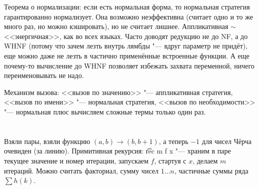 Теорема о нормализации: если есть нормальная форма, то нормальная стратегия гарантированно нормализует.
Она возможно неэффективна (считает одно и то же много раз, но можно кэшировать), но не считает лишнее.
Аппликативная $\sim$ <<энергичная>>, как во всех языках.
Часто доводят редукцию не до NF, а до WHNF (потому что зачем лезть внутрь лямбды "--- вдруг параметр не придёт),
еще можно даже не лезть в частично применённые встроенные функции.
А еще почему-то вычисление до WHNF позволяет избежать захвата переменной, ничего переименовывать не надо.

Механизм вызова: <<вызов по значению>> "--- аппликативная стратегия, <<вызов по имени>> "--- нормальная стратегия,
<<вызов по необходимости>> "--- нормальная плюс вычисляем сложные термы только один раз.

\section{} %
Взяли пары, взяли функцию $(a, b) \to (b, b+1)$, а теперь $-1$ для чисел Чёрча очевиден (за линию).
Примитивная рекурсия: \t{rec m f x} "--- храним в паре текущее значение и номер итерации,
запускаем $f$, стартуя с $x$, делаем $m$ итераций.
Можно считать факториал, сумму чисел $1\dots n$, частичные суммы ряда $\sum h(k)$.
